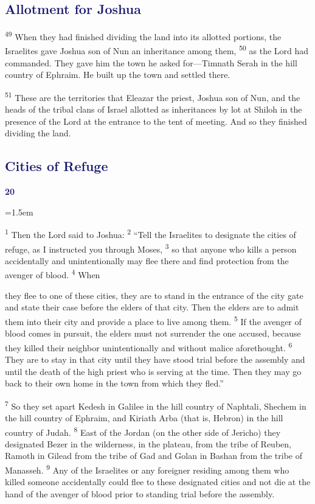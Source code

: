 \documentclass[12pt,twoside]{article}
\newcommand{\vs}[1]{\textsuperscript{#1}}
\newcommand{\chapterWithBigIndent}[2]{%
  \noindent
  \begin{minipage}[t]{1cm}
    \vspace{-0.4\baselineskip}
    {\textcolor{MidnightBlue}{\fontsize{40pt}{48pt}\selectfont \textbf{#1}}}
  \end{minipage}%
  \hspace{0.9cm}%
  \begin{minipage}[t]{\dimexpr\linewidth - 1.5cm - 0.3cm\relax}
    \hangindent=1.5em
    \hangafter=3
    #2
    \vspace{0.05cm}
  \end{minipage}
}
\begin{document}
\subsection*{\textcolor{MidnightBlue}{\textbf{Allotment for Joshua}}}

\hspace{0.5cm} \vs{49} When they had finished dividing the land into its allotted portions, the Israelites gave Joshua son of Nun an inheritance among them,
\vs{50} as the Lord had commanded. They gave him the town he asked for---Timnath Serah in the hill country of Ephraim. He built up the town and settled there.

\vs{51} These are the territories that Eleazar the priest, Joshua son of Nun, and the heads of the tribal clans of Israel allotted as inheritances by lot at Shiloh in the presence of the Lord at the entrance to the tent of meeting. And so they finished dividing the land.

\subsection*{\textcolor{MidnightBlue}{\textbf{Cities of Refuge}}}

\chapterWithBigIndent{20}{
  \vs{1} Then the Lord said to Joshua:
  \vs{2} ``Tell the Israelites to designate the cities of refuge, as I instructed you through Moses,
  \vs{3} so that anyone who kills a person accidentally and unintentionally may flee there and find protection from the avenger of blood.
  \vs{4} When\vspace{0.1cm}
}
\noindent they flee to one of these cities, they are to stand in the entrance of the city gate and state their case before the elders of that city. Then the elders are to admit them into their city and provide a place to live among them.
\vs{5} If the avenger of blood comes in pursuit, the elders must not surrender the one accused, because they killed their neighbor unintentionally and without malice aforethought.
\vs{6} They are to stay in that city until they have stood trial before the assembly and until the death of the high priest who is serving at the time. Then they may go back to their own home in the town from which they fled.''

\vs{7} So they set apart Kedesh in Galilee in the hill country of Naphtali, Shechem in the hill country of Ephraim, and Kiriath Arba (that is, Hebron) in the hill country of Judah.
\vs{8} East of the Jordan (on the other side of Jericho) they designated Bezer in the wilderness, in the plateau, from the tribe of Reuben, Ramoth in Gilead from the tribe of Gad and Golan in Bashan from the tribe of Manasseh.
\vs{9} Any of the Israelites or any foreigner residing among them who killed someone accidentally could flee to these designated cities and not die at the hand of the avenger of blood prior to standing trial before the assembly.
\end{document}

